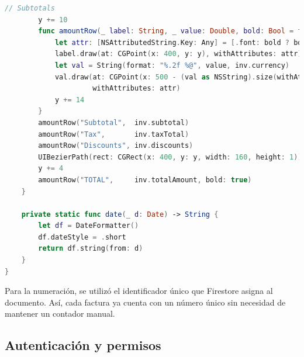 \begin{large}
\begin{lstlisting}[language={swift}, caption={Servicio para generar PDF de facturas}]
        // Subtotals
        y += 10
        func amountRow(_ label: String, _ value: Double, bold: Bool = false) {
            let attr: [NSAttributedString.Key: Any] = [.font: bold ? boldFont : textFont]
            label.draw(at: CGPoint(x: 400, y: y), withAttributes: attr)
            let val = String(format: "%.2f %@", value, inv.currency)
            val.draw(at: CGPoint(x: 500 - (val as NSString).size(withAttributes: attr).width, y: y),
                     withAttributes: attr)
            y += 14
        }
        amountRow("Subtotal",  inv.subtotal)
        amountRow("Tax",       inv.taxTotal)
        amountRow("Discounts", inv.discounts)
        UIBezierPath(rect: CGRect(x: 400, y: y, width: 160, height: 1)).fill()
        y += 4
        amountRow("TOTAL",     inv.totalAmount, bold: true)
    }
    
    private static func date(_ d: Date) -> String {
        let df = DateFormatter()
        df.dateStyle = .short
        return df.string(from: d)
    }
}
\end{lstlisting}

Para la numeración, se utilizó el identificador único que Firestore asigna al documento. Así, cada factura ya cuenta con un número único sin necesidad de mantener un contador manual.

\end{large}

\subsection{Autenticación y permisos}

